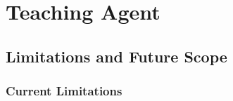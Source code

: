%


\section{Teaching Agent}
\label{app:teaching}

\subsection{Limitations and Future Scope}
\label{sec:ta-future}

\subsubsection{Current Limitations}

